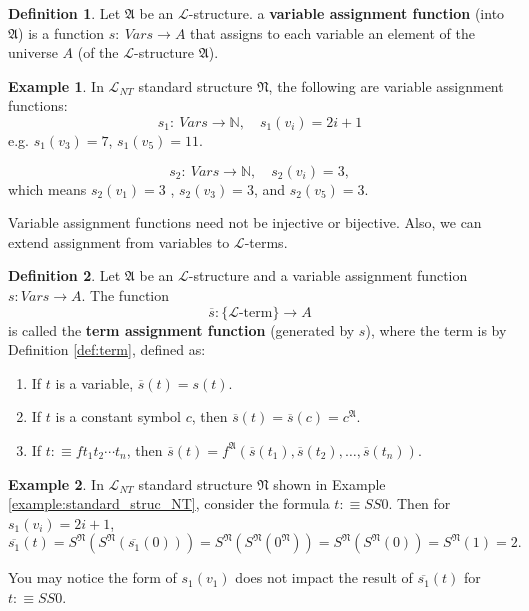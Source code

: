 \documentclass[11pt,letterpaper]{book}
\theoremstyle{definition}
\newtheorem{definition}{Definition}[section]
\newtheorem{example}{Example}[section]
\begin{document}
\begin{definition}\label{def:var_assignment_func}
Let $\mathfrak{A}$ be an $\mathcal{L}$-structure. a \textbf{variable
assignment function} (into $\mathfrak{A}$) is a function $s: \ Vars
\rightarrow A $ that assigns to each variable an element of the universe
$A$ (of the $\mathcal{L}$-structure $\mathfrak{A}$).
\end{definition}

\begin{example}
In $\mathcal{L}_{NT}$ standard structure $\mathfrak{N}$, the following
are variable assignment functions:
\begin{equation}
s_1 : \ Vars \rightarrow \mathbb{N}, \quad s_1 (v_i) = 2 i + 1 \nonumber
\end{equation}
e.g. $s_1(v_3) = 7$, $s_1 (v_5) = 11$.

\begin{equation}
s_2 : \ Vars \rightarrow \mathbb{N}, \quad s_2 (v_i) = 3, \nonumber
\end{equation}
which means $s_2 (v_1)= 3$ , $s_2 (v_3)= 3$, and $s_2 (v_5) = 3$.
\end{example}

Variable assignment functions need not be injective or bijective. Also,
we can extend assignment from variables to $\mathcal{L}$-terms.


\begin{definition}\label{def:term_assignment_func}
Let $\mathfrak{A}$ be an $\mathcal{L}$-structure and a variable
assignment function $s: Vars \rightarrow A$. The function
$$\overline{s}: \{ \mathcal{L} \mbox{-term} \} \rightarrow A $$
is called the \textbf{term assignment function} (generated by $s$),
where the term is by Definition \ref{def:term}, defined as:
\begin{enumerate}
\item{If $t$ is a variable, $\overline{s} (t) = s(t)$.}
\item{If $t$ is a constant symbol $c$, then $\overline{s} (t) =
\overline{s} (c) = c^{\mathfrak{A}}$.}
\item{If $t:\equiv ft_1 t_2 \cdots t_n$, then $\overline{s} (t) =
f^{\mathfrak{A}} (\overline{s} (t_1), \overline{s} (t_2), \ldots,
\overline{s} (t_n)  ) $.}
\end{enumerate}
\end{definition}

\begin{example}
In $\mathcal{L}_{NT}$ standard structure $\mathfrak{N}$ shown in Example 
\ref{example:standard_struc_NT}, consider
the formula $t:\equiv SS0$. Then for $s_1(v_i) = 2i + 1$,
$$ \overline{s_1}(t) = S^{\mathfrak{N}}(S^{\mathfrak{N}} (\overline{s_1}
(0)) ) = S^{\mathfrak{N}} ( S^{\mathfrak{N}} (0^{\mathfrak{N}} ) ) = 
S^{\mathfrak{N}} ( S^{\mathfrak{N}} (0) ) = S^{\mathfrak{N}} ( 1 ) = 2 . $$

You may notice the form of $s_1 (v_1)$ does not impact the
result of $\overline{s_1}(t)$ for $t:\equiv SS0$.
\end{example}
\end{document}
